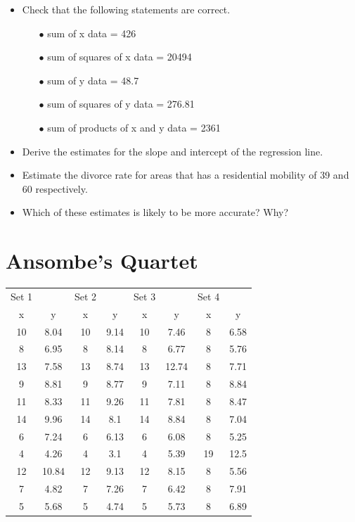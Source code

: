 \documentclass[]{report}
\begin{document}
	
	
	\begin{itemize}
		\item Check that the following statements are correct.
		
		\begin{itemize}
			\item[$\bullet$] sum of x data = 426
			\item[$\bullet$] sum of squares of x data = 20494
			\item[$\bullet$]sum of y data = 48.7
			\item[$\bullet$] sum of squares of y data = 276.81
			\item[$\bullet$] sum of products of x and y data = 2361
		\end{itemize}
		
		\item Derive the estimates for the slope and intercept of the regression line.
		\item Estimate the divorce rate for areas that has a residential mobility of 39 and 60 respectively.
		\item Which of these estimates is likely to be more accurate? Why?
		
	\end{itemize}
	
	
	
\newpage	


\section*{Ansombe's Quartet}
\begin{tabular}{||c|c||c|c||c|c||c|c||}
	\hline
	Set 1 	&		&	Set 2	&		&	Set 3	&		&	Set 4	&		\\
	x	&	y	&	x	&	y	&	x	&	y	&	x	&	y	\\
	10	&	8.04	&	10	&	9.14	&	10	&	7.46	&	8	&	6.58	\\
	8	&	6.95	&	8	&	8.14	&	8	&	6.77	&	8	&	5.76	\\
	13	&	7.58	&	13	&	8.74	&	13	&	12.74	&	8	&	7.71	\\
	9	&	8.81	&	9	&	8.77	&	9	&	7.11	&	8	&	8.84	\\
	11	&	8.33	&	11	&	9.26	&	11	&	7.81	&	8	&	8.47	\\
	14	&	9.96	&	14	&	8.1	&	14	&	8.84	&	8	&	7.04	\\
	6	&	7.24	&	6	&	6.13	&	6	&	6.08	&	8	&	5.25	\\
	4	&	4.26	&	4	&	3.1	&	4	&	5.39	&	19	&	12.5	\\
	12	&	10.84	&	12	&	9.13	&	12	&	8.15	&	8	&	5.56	\\
	7	&	4.82	&	7	&	7.26	&	7	&	6.42	&	8	&	7.91	\\
	5	&	5.68	&	5	&	4.74	&	5	&	5.73	&	8	&	6.89	\\
	\hline
\end{tabular}
\end{document}
